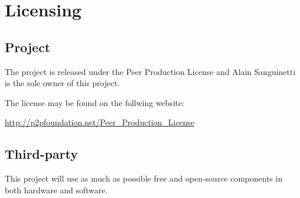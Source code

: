 \chapter{Licensing}

\section{Project}


The project is released under the Peer Production License and Alain Sanguinetti is the sole owner of this project.

The license may be found on the follwing website: 

\url{http://p2pfoundation.net/Peer_Production_License}

\section{Third-party}
This project will use as much as possible free and open-source components in both hardware and software. 